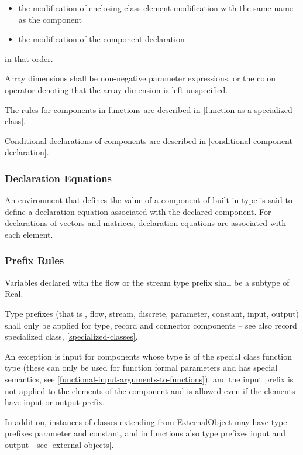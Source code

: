 \documentclass[10pt,a4paper]{report}
\def\doublelabel#1{\label{#1}\hypertarget{#1}{}}
\begin{document}
\begin{itemize}
\item
  the modification of enclosing class element-modification with the same
  name as the component
\item
  the modification of the component declaration
\end{itemize}
in that order.

Array dimensions shall be non-negative parameter expressions, or the
colon operator denoting that the array dimension is left unspecified.

The rules for components in functions are described in \ref{function-as-a-specialized-class}.

Conditional declarations of components are described in \ref{conditional-component-declaration}.

\subsubsection{Declaration Equations}\doublelabel{declaration-equations}

An environment that defines the value of a component of built-in type is
said to define a declaration equation associated with the declared
component. For declarations of vectors and matrices, declaration
equations are associated with each element.

\subsubsection{Prefix Rules}\doublelabel{prefix-rules}

Variables declared with the flow or the stream type prefix shall be a
subtype of Real.

Type prefixes (that is , flow, stream, discrete, parameter, constant,
input, output) shall only be applied for type, record and connector
components -- see also record specialized class, \ref{specialized-classes}.

An exception is input for components whose type is of the special class
function type (these can only be used for function formal parameters and
has special semantics, see \ref{functional-input-arguments-to-functions}), and the input prefix is not
applied to the elements of the component and is allowed even if the
elements have input or output prefix.

In addition, instances of classes extending from ExternalObject may have
type prefixes parameter and constant, and in functions also type
prefixes input and output - see \ref{external-objects}.
\end{document}
